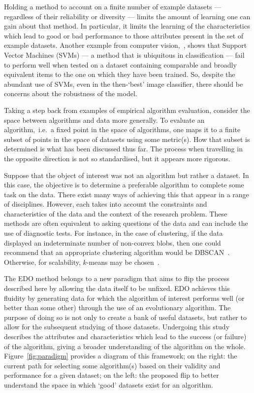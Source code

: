 Holding a method to account on a finite number of example datasets ---
regardless of their reliability or diversity --- limits the amount of learning
one can gain about that method. In particular, it limits the learning of the
characteristics which lead to good or bad performance to those attributes
present in the set of example datasets. Another example from computer
vision,~\cite{Torralba2011}, shows that Support Vector Machines (SVMs) --- a
method that is ubiquitous in classification --- fail to perform well when tested
on a dataset containing comparable and broadly equivalent items to the one on
which they have been trained. So, despite the abundant use of SVMs, even in the
then-`best' image classifier, there should be concerns about the robustness of
the model.

Taking a step back from examples of empirical algorithm evaluation, consider the
space between algorithms and data more generally. To evaluate an
algorithm,~i.e.\ a fixed point in the space of algorithms, one maps it to a
finite subset of points in the space of datasets using some metric(s). How that
subset is determined is what has been discussed thus far. The process when
travelling in the opposite direction is not so standardised, but it appears more
rigorous.

Suppose that the object of interest was not an algorithm but rather a dataset.
In this case, the objective is to determine a preferable algorithm to complete
some task on the data. There exist many ways of achieving this that appear in a
range of disciplines. However, each takes into account the constraints and
characteristics of the data and the context of the research problem. These
methods are often equivalent to asking questions of the data and can include the
use of diagnostic tests. For instance, in the case of clustering, if the data
displayed an indeterminate number of non-convex blobs, then one could recommend
that an appropriate clustering algorithm would be DBSCAN~\cite{Ester1996}.
Otherwise, for scalability, \(k\)-means may be chosen~\cite{Wu2009,Zhao2009}.

The EDO method belongs to a new paradigm that aims to flip the process described
here by allowing the data itself to be unfixed. EDO achieves this fluidity by
generating data for which the algorithm of interest performs well (or better
than some other) through the use of an evolutionary algorithm. The purpose of
doing so is not only to create a bank of useful datasets, but rather to allow
for the subsequent studying of those datasets. Undergoing this study describes
the attributes and characteristics which lead to the success (or failure) of the
algorithm, giving a broader understanding of the algorithm on the whole.
Figure~\ref{fig:paradigm} provides a diagram of this framework; on the right:
the current path for selecting some algorithm(s) based on their validity and
performance for a given dataset; on the left: the proposed flip to better
understand the space in which `good' datasets exist for an algorithm.

